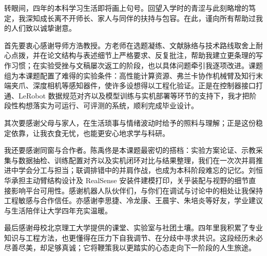 
\begin{acknowledgements}
  转眼间，四年的本科学习生活即将画上句号。回望入学时的青涩与此刻略增的笃定，我深知成长离不开师长、家人与同伴的扶持与包容。在此，谨向所有帮助过我的人们致以诚挚谢意。

  首先要衷心感谢导师方浩教授。方老师在选题凝练、文献脉络与技术路线取舍上耐心点拨，并在论文结构与表述细节上严格要求、反复批注，帮助我建立更条理的写作习惯；在实验受挫与文稿屡次返工的阶段，也以具体问题牵引我逐项改进。课题组为本课题配置了难得的实验条件：高性能计算资源、弗兰卡协作机械臂及知行末端夹爪、深度相机等感知器件，使许多设想得以工程化验证。正是在控制器接口打通、LeRobot 数据规范对齐以及模型训练与实机部署等环节的支持下，我才把阶段性构想落实为可运行、可评测的系统，顺利完成毕业设计。

  其次要感谢父母与家人，在生活琐事与情绪波动时给予的照料与理解；正是这份稳定依靠，让我衣食无忧，也能更安心地求学与科研。

  我还要感谢同窗与合作者。陈禹佟是本课题最密切的搭档：实验方案论证、示教采集与数据抽检、训练配置对齐以及实机闭环对比与结果整理，我们在一次次并肩推进中学会分工与担当；联调排错中的并肩作战，也成为本科阶段难忘的记忆。刘恒华承担主动臂结构设计及 RealSense 安装件建模打印，关乎装配与视野的细节直接影响平台可用性。感谢机器人队伙伴们，与你们在调试与讨论中的相处让我保持工程敏感与合作信任。亦感谢李思捷、冷龙康、王晨宇、朱培炎等好友，学业建议与生活陪伴让大学四年充实温暖。

  最后感谢母校北京理工大学提供的课堂、实验室与社团土壤。四年里我积累了专业知识与工程方法，也更懂得在压力下自我调节、在分歧中寻求共识。这段经历未必尽善尽美，却足够真诚；它将鞭策我以更踏实的心态走向下一阶段的人生旅途。


\end{acknowledgements}
